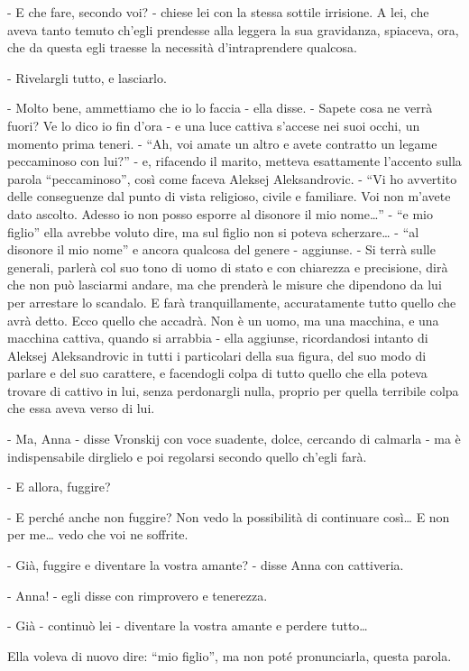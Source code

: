 - E che fare, secondo voi? - chiese lei con la stessa sottile irrisione. A lei, che aveva tanto temuto ch'egli prendesse alla leggera la sua gravidanza, spiaceva, ora, che da questa egli traesse la necessità d'intraprendere qualcosa. 

- Rivelargli tutto, e lasciarlo. 

- Molto bene, ammettiamo che io lo faccia - ella disse. - Sapete cosa ne verrà fuori? Ve lo dico io fin d'ora - e una luce cattiva s'accese nei suoi occhi, un momento prima teneri. - ``Ah, voi amate un altro e avete contratto un legame peccaminoso con lui?'' - e, rifacendo il marito, metteva esattamente l'accento sulla parola ``peccaminoso'', così come faceva Aleksej Aleksandrovic. - ``Vi ho avvertito delle conseguenze dal punto di vista religioso, civile e familiare. Voi non m'avete dato ascolto. Adesso io non posso esporre al disonore il mio nome\ldots{}'' - ``e mio figlio'' ella avrebbe voluto dire, ma sul figlio non si poteva scherzare\ldots{} - ``al disonore il mio nome'' e ancora qualcosa del genere - aggiunse. - Si terrà sulle generali, parlerà col suo tono di uomo di stato e con chiarezza e precisione, dirà che non può lasciarmi andare, ma che prenderà le misure che dipendono da lui per arrestare lo scandalo. E farà tranquillamente, accuratamente tutto quello che avrà detto. Ecco quello che accadrà. Non è un uomo, ma una macchina, e una macchina cattiva, quando si arrabbia - ella aggiunse, ricordandosi intanto di Aleksej Aleksandrovic in tutti i particolari della sua figura, del suo modo di parlare e del suo carattere, e facendogli colpa di tutto quello che ella poteva trovare di cattivo in lui, senza perdonargli nulla, proprio per quella terribile colpa che essa aveva verso di lui. 

- Ma, Anna - disse Vronskij con voce suadente, dolce, cercando di calmarla - ma è indispensabile dirglielo e poi regolarsi secondo quello ch'egli farà. 

- E allora, fuggire? 

- E perché anche non fuggire? Non vedo la possibilità di continuare così\ldots{} E non per me\ldots{} vedo che voi ne soffrite. 

- Già, fuggire e diventare la vostra amante? - disse Anna con cattiveria. 

- Anna! - egli disse con rimprovero e tenerezza. 

- Già - continuò lei - diventare la vostra amante e perdere tutto\ldots{} 

Ella voleva di nuovo dire: ``mio figlio'', ma non poté pronunciarla, questa parola. 

